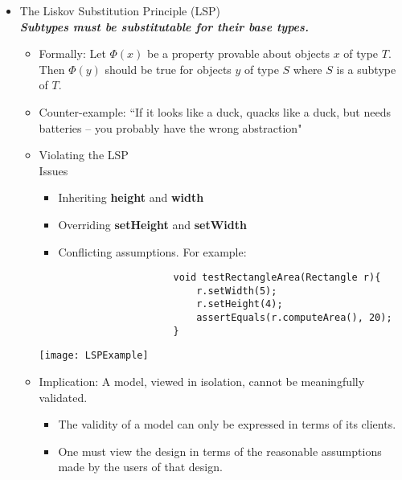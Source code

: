 \begin{itemize}
	\item The Liskov Substitution Principle (LSP)\\
	\textbf{\emph{Subtypes must be substitutable for their base types.}}
	\begin{itemize}
		\item Formally: Let $ \Phi(x) $ be a property provable about objects $ x $ of type $ T $. Then $ \Phi(y) $ should be true for objects $ y $ of type $ S $ where $ S $ is a subtype of $ T $.
		\item Counter-example: ``If it looks like a duck, quacks like a duck, but needs batteries – you probably have the wrong abstraction"
		\item Violating the LSP\\
		Issues\\
		\begin{minipage}{0.6\textwidth}
			\begin{itemize}
				\item Inheriting \textbf{height} and \textbf{width}
				\item Overriding \textbf{setHeight} and \textbf{setWidth}
				\item Conflicting assumptions. For example:
				\begin{Verbatim}
					void testRectangleArea(Rectangle r){
						r.setWidth(5);
						r.setHeight(4);
						assertEquals(r.computeArea(), 20);
					}
				\end{Verbatim}
			\end{itemize}
		\end{minipage}
		\begin{minipage}{0.3\textwidth}
			\texttt{[image: LSPExample]}
		\end{minipage}

		\item Implication: A model, viewed in isolation, cannot be meaningfully validated.
		\begin{itemize}
			\item The validity of a model can only be expressed in terms of its clients.
			\item One must view the design in terms of the reasonable assumptions made by
			the users of that design.
		\end{itemize}
	\end{itemize}


\end{itemize}
